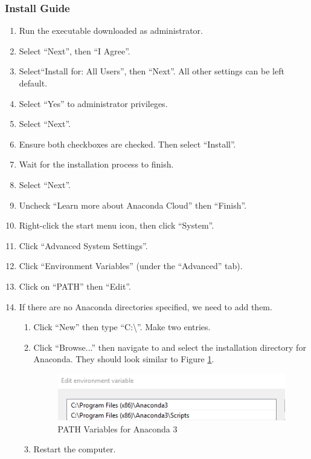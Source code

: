 \documentclass[11pt, letterpaper, titlepage]{article}
\begin{document}
\subsubsection{Install Guide} %
\begin{enumerate}
    \item Run the executable downloaded as administrator.
    \item Select ``Next'', then ``I Agree''.
    \item Select``Install for: All Users'', then ``Next''.
          All other settings can be left default.
    \item Select ``Yes'' to administrator privileges.
    \item Select ``Next''.
    \item Ensure both checkboxes are checked. Then select ``Install''.
    \item Wait for the installation process to finish.
    \item Select ``Next''.
    \item Uncheck ``Learn more about Anaconda Cloud'' then ``Finish''.
    \item Right-click the start menu icon, then click ``System''.
    \item Click ``Advanced System Settings''.
    \item Click ``Environment Variables'' (under the ``Advanced'' tab).
    \item Click on ``PATH'' then ``Edit''.
    \item If there are no Anaconda directories specified, we need to add them.
    \begin{enumerate}
        \item Click ``New'' then type ``C:\textbackslash''. Make two entries.
        \item Click ``Browse...'' then navigate to and select the installation directory for Anaconda.
        \subitem They should look similar to Figure \ref{fig:anaconda_path}.
        \begin{figure}[h]
            \begin{center}
            \includegraphics[scale=1.0]{anaconda_path.png}
            \caption{PATH Variables for Anaconda 3}
            \label{fig:anaconda_path}
            \end{center}
        \end{figure}
        \item Restart the computer.
    \end{enumerate}
\end{enumerate}
\end{document}
